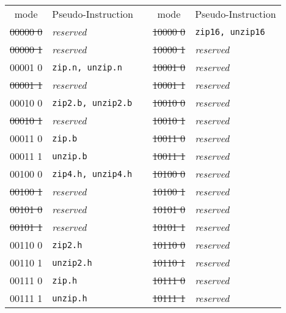 \begin{table}[h]
\begin{small}
\begin{center}
\begin{tabular}{c l p{1in} c l}
      mode     & Pseudo-Instruction       &   &         mode     & Pseudo-Instruction      \\

\cline{1-2}
\cline{4-5}

\sout{00000 0} & {\it reserved}           &   &   \sout{10000 0} & {\tt zip16, unzip16}    \\
\sout{00000 1} & {\it reserved}           &   &   \sout{10000 1} & {\it reserved}          \\
      00001 0  & {\tt zip.n, unzip.n}     &   &   \sout{10001 0} & {\it reserved}          \\
\sout{00001 1} & {\it reserved}           &   &   \sout{10001 1} & {\it reserved}          \\
      00010 0  & {\tt zip2.b, unzip2.b}   &   &   \sout{10010 0} & {\it reserved}          \\
\sout{00010 1} & {\it reserved}           &   &   \sout{10010 1} & {\it reserved}          \\
      00011 0  & {\tt zip.b}              &   &   \sout{10011 0} & {\it reserved}          \\
      00011 1  & {\tt unzip.b}            &   &   \sout{10011 1} & {\it reserved}          \\

\cline{1-2}
\cline{4-5}

      00100 0  & {\tt zip4.h, unzip4.h}   &   &   \sout{10100 0} & {\it reserved}          \\
\sout{00100 1} & {\it reserved}           &   &   \sout{10100 1} & {\it reserved}          \\
\sout{00101 0} & {\it reserved}           &   &   \sout{10101 0} & {\it reserved}          \\
\sout{00101 1} & {\it reserved}           &   &   \sout{10101 1} & {\it reserved}          \\
      00110 0  & {\tt zip2.h}             &   &   \sout{10110 0} & {\it reserved}          \\
      00110 1  & {\tt unzip2.h}           &   &   \sout{10110 1} & {\it reserved}          \\
      00111 0  & {\tt zip.h}              &   &   \sout{10111 0} & {\it reserved}          \\
      00111 1  & {\tt unzip.h}            &   &   \sout{10111 1} & {\it reserved}          \\


\end{tabular}
\end{center}
\end{small}
\end{table}
